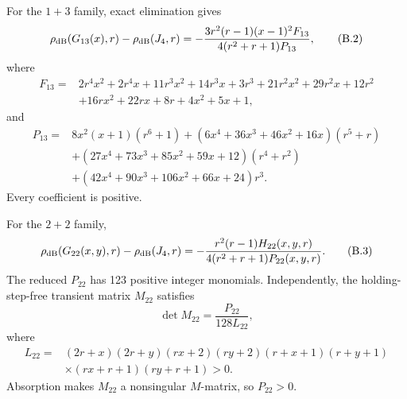 For the $1+3$ family, exact elimination gives
\[
 \rho_{\mathrm{dB}}(G_{13}(x),r)-\rho_{\mathrm{dB}}(J_4,r)
 =-\frac{3r^2(r-1)(x-1)^2F_{13}}
 {4(r^2+r+1)P_{13}},                                       \tag{B.2}\label{B.2}
\]
where
\[
\begin{aligned}
F_{13}={}&2r^4x^2+2r^4x+11r^3x^2+14r^3x+3r^3
 +21r^2x^2+29r^2x+12r^2\\
&+16rx^2+22rx+8r+4x^2+5x+1,
\end{aligned}
\]
and
\[
\begin{aligned}
P_{13}={}&8x^2(x+1)(r^6+1)
 +(6x^4+36x^3+46x^2+16x)(r^5+r)\\
&+(27x^4+73x^3+85x^2+59x+12)(r^4+r^2)\\
&+(42x^4+90x^3+106x^2+66x+24)r^3.
\end{aligned}
\]
Every coefficient is positive.

For the $2+2$ family,
\[
 \rho_{\mathrm{dB}}(G_{22}(x,y),r)-\rho_{\mathrm{dB}}(J_4,r)
 =-\frac{r^2(r-1)H_{22}(x,y,r)}
 {4(r^2+r+1)P_{22}(x,y,r)}.                                 \tag{B.3}\label{B.3}
\]
The reduced $P_{22}$ has 123 positive integer monomials.  Independently,
the holding-step-free transient matrix $M_{22}$ satisfies
\[
 \det M_{22}=\frac{P_{22}}{128L_{22}},                       \tag{B.4}\label{B.4}
\]
where
\[
\begin{aligned}
L_{22}={}&(2r+x)(2r+y)(rx+2)(ry+2)(r+x+1)(r+y+1)\\
&\times(rx+r+1)(ry+r+1)>0.
\end{aligned}
\]
Absorption makes $M_{22}$ a nonsingular $M$-matrix, so $P_{22}>0$.

